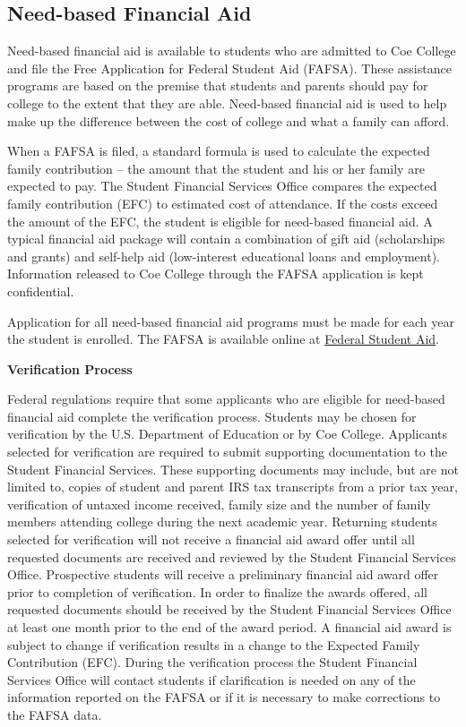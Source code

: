 \documentclass[
  letterpaper,
]{scrbook}
\begin{document}
\subsection{Need-based Financial Aid}\label{need-based-financial-aid}

Need-based financial aid is available to students who are admitted to
Coe College and file the Free Application for Federal Student Aid
(FAFSA). These assistance programs are based on the premise that
students and parents should pay for college to the extent that they are
able. Need-based financial aid is used to help make up the difference
between the cost of college and what a family can afford.

When a FAFSA is filed, a standard formula is used to calculate the
expected family contribution -- the amount that the student and his or
her family are expected to pay. The Student Financial Services Office
compares the expected family contribution (EFC) to estimated cost of
attendance. If the costs exceed the amount of the EFC, the student is
eligible for need-based financial aid. A typical financial aid package
will contain a combination of gift aid (scholarships and grants) and
self-help aid (low-interest educational loans and employment).
Information released to Coe College through the FAFSA application is
kept confidential.

Application for all need-based financial aid programs must be made for
each year the student is enrolled. The FAFSA is available online at
\href{www.fafsa.gov}{Federal Student Aid}.

\textbf{Verification Process}

Federal regulations require that some applicants who are eligible for
need-based financial aid complete the verification process. Students may
be chosen for verification by the U.S. Department of Education or by Coe
College. Applicants selected for verification are required to submit
supporting documentation to the Student Financial Services. These
supporting documents may include, but are not limited to, copies of
student and parent IRS tax transcripts from a prior tax year,
verification of untaxed income received, family size and the number of
family members attending college during the next academic year.
Returning students selected for verification will not receive a
financial aid award offer until all requested documents are received and
reviewed by the Student Financial Services Office. Prospective students
will receive a preliminary financial aid award offer prior to completion
of verification. In order to finalize the awards offered, all requested
documents should be received by the Student Financial Services Office at
least one month prior to the end of the award period. A financial aid
award is subject to change if verification results in a change to the
Expected Family Contribution (EFC). During the verification process the
Student Financial Services Office will contact students if clarification
is needed on any of the information reported on the FAFSA or if it is
necessary to make corrections to the FAFSA data.
\end{document}
